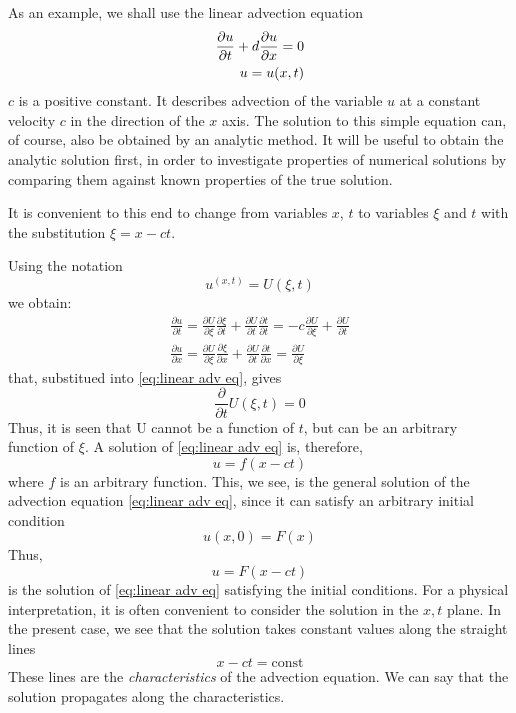As an example, we shall use the linear advection equation
\begin{align}\label{eq:linear adv eq}
	\frac{\partial u}{\partial t}+d\frac{\partial u}{\partial x}=0 \notag \\
	u=u(x,t)
\end{align}
$c$ is a positive constant.
It describes advection of the variable $u$ at a constant velocity $c$ in the direction of the $x$ axis. The solution to this simple equation can, of course, also be obtained by an analytic method. It will be useful to obtain the analytic solution first, in order to investigate properties of numerical solutions by comparing them against known properties of the true solution.

It is convenient to this end to change from variables $x$, $t$ to variables $\xi$ and $t$ with the substitution $\xi=x-ct$.

Using the notation
$$u^{(x,t)}=U(\xi,t)$$
we obtain:
\begin{align}
	\frac{\partial u}{\partial t}=\frac{\partial U}{\partial\xi}\frac{\partial\xi}{\partial t}+\frac{\partial U}{\partial t}\frac{\partial t}{\partial t}=-c\frac{\partial U}{\partial\xi}+\frac{\partial U}{\partial t} \\
	\frac{\partial u}{\partial x}=\frac{\partial U}{\partial\xi}\frac{\partial\xi}{\partial x}+\frac{\partial U}{\partial t}\frac{\partial t}{\partial x}=\frac{\partial U}{\partial\xi}
\end{align}
that, substitued into \ref{eq:linear adv eq}, gives
$$\frac{\partial}{\partial t}U(\xi, t)=0$$
Thus, it is seen that U cannot be a function of $t$, but can be an arbitrary function of $\xi$. A solution of \ref{eq:linear adv eq} is, therefore,
\begin{equation}\label{eq:sol of linear adv eq}
	u=f(x-ct)
\end{equation}
where $f$ is an arbitrary function. This, we see, is the general solution of the advection equation \ref{eq:linear adv eq}, since it can satisfy an arbitrary initial condition
\begin{equation}
	u(x,0)=F(x)
\end{equation}
Thus,
\begin{equation}
	u=F(x-ct)
\end{equation}
is the solution of \ref{eq:linear adv eq} satisfying the initial conditions.
For a physical interpretation, it is often convenient to consider the solution in the $x, t$ plane. In the present case, we see that the solution takes constant values along the straight lines
$$x-ct= \text{const}$$
These lines are the \textit{characteristics} of the advection equa­tion. We can say that the solution propagates along the characteristics.\\





